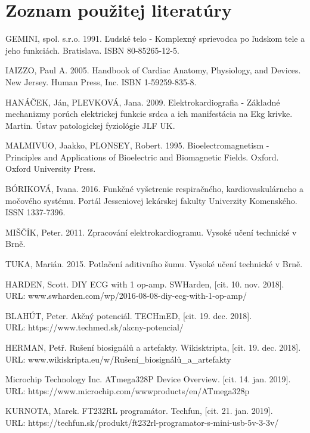 \documentclass[titlepage,12pt]{article}
\begin{document}
\section{Zoznam použitej literatúry}
\begin{enumerate}[label={[\arabic*]}]
\item GEMINI, spol. s.r.o. 1991. Ľudské telo - Komplexný sprievodca po ľudskom tele a jeho funkciách. Bratislava. ISBN 80-85265-12-5.
\item IAIZZO, Paul A. 2005. Handbook of Cardiac Anatomy, Physiology, and Devices. New Jersey. Human Press, Inc. ISBN 1-59259-835-8.
\item HANÁČEK, Ján, PLEVKOVÁ, Jana. 2009. Elektrokardiografia - Základné mechanizmy porúch elektrickej funkcie srdca a ich manifestácia na Ekg krivke. Martin. Ústav patologickej fyziológie JLF UK.
\item MALMIVUO, Jaakko, PLONSEY, Robert. 1995. Bioelectromagnetism - Principles and Applications of Bioelectric and Biomagnetic Fields. Oxford. Oxford University Press.
\item BÓRIKOVÁ, Ivana. 2016. Funkčné vyšetrenie respiračného, kardiovaskulárneho a močového systému. Portál Jesseniovej lekárskej fakulty Univerzity Komenského. ISSN 1337-7396.
\item MIŠČÍK, Peter. 2011. Zpracování elektrokardiogramu. Vysoké učení technické v Brně. 
\item TUKA, Marián. 2015. Potlačení aditivního šumu. Vysoké učení technické v Brně. 
\item HARDEN, Scott. DIY ECG with 1 op-amp. SWHarden, [cit. 10. nov. 2018]. \\ URL: www.swharden.com/wp/2016-08-08-diy-ecg-with-1-op-amp/
\item BLAHÚT, Peter. Akčný potenciál. TECHmED, [cit. 19. dec. 2018]. \\ 
URL: https://www.techmed.sk/akcny-potencial/
\item HERMAN, Petř. Rušení biosignálů a artefakty. Wikisktripta,  [cit. 19. dec. 2018]. \\ URL: www.wikiskripta.eu/w/Rušení\_biosignálů\_a\_artefakty
\item Microchip Technology Inc. ATmega328P Device Overview. [cit. 14. jan. 2019]. \\ URL: https://www.microchip.com/wwwproducts/en/ATmega328p
\item KURNOTA, Marek. FT232RL programátor. Techfun, [cit. 21. jan. 2019]. \\ URL: https://techfun.sk/produkt/ft232rl-programator-s-mini-usb-5v-3-3v/

\end{enumerate}
\end{document}
